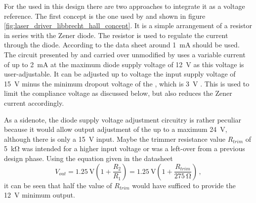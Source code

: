 For the  used in this design there are two approaches to integrate it as a voltage reference. The first concept is the one used by \citeauthor{libbrecht_hall} \cite{libbrecht_hall} and shown in figure \ref{fig:laser_driver_libbrecht_hall_concept}. It is a simple arrangement of a resistor in series with the Zener diode. The resistor is used to regulate the current through the diode. According to the data sheet around \qty{1}{\mA} \cite{datasheet_LM399} should be used. The circuit presented by \cite{libbrecht_hall} and carried over unmodified by \citeauthor{laser_driver_mosfet_noise} \cite{laser_driver_mosfet_noise} uses a variable current of up to \qty{2}{\mA} at the maximum diode supply voltage of \qty{12}{\V} as this voltage is user-adjustable. It can be adjusted up to voltage the input supply voltage of \qty{15}{\V} minus the minimum dropout voltage of the , which is \qty{3}{\V} \cite{datasheet_LM317}. This is used to limit the compliance voltage as discussed below, but also reduces the Zener current accordingly.

As a sidenote, the diode supply voltage adjustment circuitry is rather peculiar because it would allow output adjustment of the  up to a maximum \qty{24}{\V}, although there is only a \qty{15}{\V} input. Maybe the trimmer resistance value $R_{trim}$ of \qty{5}{\kilo \ohm} was intended for a higher input voltage or was a left-over from a previous design phase. Using the equation given in the datasheet \cite{datasheet_LM317}
\begin{equation*}
    V_{out} = \qty{1.25}{\V} \left( 1 + \frac{R_2}{R_1} \right) = \qty{1.25}{\V} \left( 1 + \frac{R_{trim}}{\qty{275}{\ohm}} \right) \,,
\end{equation*}
it can be seen that half the value of $R_{trim}$ would have sufficed to provide the \qty{12}{\V} minimum output.

